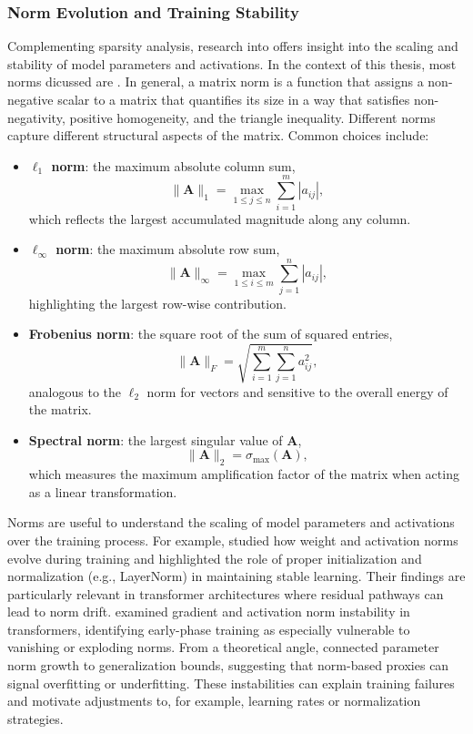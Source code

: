 \subsubsection{Norm Evolution and Training Stability}

Complementing sparsity analysis, research into  offers insight into the scaling and stability of model parameters and activations. In the context of this thesis, most norms dicussed are . In general, a matrix norm is a function that assigns a non-negative scalar to a matrix that quantifies its size in a way that satisfies non-negativity, positive homogeneity, and the triangle inequality. Different norms capture different structural aspects of the matrix. Common choices include:

\begin{itemize}
    \item \textbf{$\ell_1$ norm}: the maximum absolute column sum,
    \[
    \|\mathbf{A}\|_1 = \max_{1 \leq j \leq n} \sum_{i=1}^m |a_{ij}|,
    \]
    which reflects the largest accumulated magnitude along any column.
    \item \textbf{$\ell_\infty$ norm}: the maximum absolute row sum,
    \[
    \|\mathbf{A}\|_\infty = \max_{1 \leq i \leq m} \sum_{j=1}^n |a_{ij}|,
    \]
    highlighting the largest row-wise contribution.
    \item \textbf{Frobenius norm}: the square root of the sum of squared entries,
    \[
    \|\mathbf{A}\|_F = \sqrt{\sum_{i=1}^m \sum_{j=1}^n a_{ij}^2},
    \]
    analogous to the $\ell_2$ norm for vectors and sensitive to the overall energy of the matrix.
    \item \textbf{Spectral norm}: the largest singular value of $\mathbf{A}$,
    \[
    \|\mathbf{A}\|_2 = \sigma_{\max}(\mathbf{A}),
    \]
    which measures the maximum amplification factor of the matrix when acting as a linear transformation.
\end{itemize}

Norms are useful to understand the scaling of model parameters and activations over the training process. For example, \citet{mishkin2016goodinit} studied how weight and activation norms evolve during training and highlighted the role of proper initialization and normalization (e.g., LayerNorm) in maintaining stable learning. Their findings are particularly relevant in transformer architectures where residual pathways can lead to norm drift. \citet{liu2020understanding} examined gradient and activation norm instability in transformers, identifying early-phase training as especially vulnerable to vanishing or exploding norms. From a theoretical angle, \citet{arora2018theoretical} connected parameter norm growth to generalization bounds, suggesting that norm-based proxies can signal overfitting or underfitting. These instabilities can explain training failures and motivate adjustments to, for example, learning rates or normalization strategies. 

